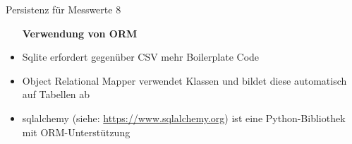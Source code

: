 \begin{frame}[fragile]{Persistenz für Messwerte 8}
       \begin{itemize}
        \setlength{\itemindent}{1.9in}
        \item [\textbf{Verwendung von ORM }]
    \end{itemize}

    \begin{itemize}
        \item Sqlite erfordert gegenüber CSV mehr Boilerplate Code
        \item Object Relational Mapper verwendet Klassen und bildet diese automatisch auf Tabellen ab
        \item sqlalchemy (siehe: \url{https://www.sqlalchemy.org}) ist eine Python-Bibliothek mit ORM-Unterstützung
     \end{itemize}

\end{frame}
